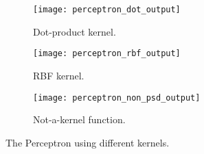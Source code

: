 \begin{answer}
	\begin{figure}[H]
	\centering
	\begin{subfigure}[H]{0.45\linewidth}
		\texttt{[image: perceptron\_dot\_output]}
		\caption{Dot-product kernel.}
	\end{subfigure}
	\begin{subfigure}[H]{0.45\linewidth}
		\texttt{[image: perceptron\_rbf\_output]}
		\caption{RBF kernel.}
	\end{subfigure}
	\begin{subfigure}[H]{0.45\linewidth}
		\texttt{[image: perceptron\_non\_psd\_output]}
		\caption{Not-a-kernel function.}
	\end{subfigure}
	\caption{The Perceptron using different kernels.}
	\end{figure}
\end{answer}
